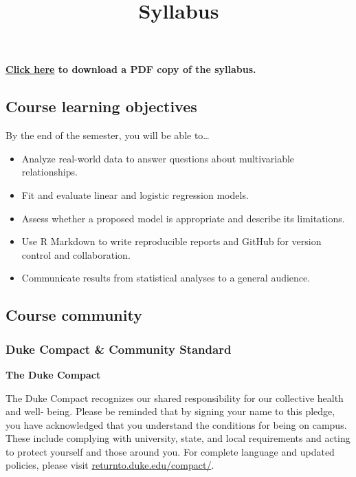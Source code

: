 \documentclass[
]{article}
\title{Syllabus}
\author{}
\date{\vspace{-2.5em}}
\providecommand{\tightlist}{%
  \setlength{\itemsep}{0pt}\setlength{\parskip}{0pt}}
\begin{document}
\maketitle

\textbf{\href{sta210-sp21-syllabus.pdf}{Click here} to download a PDF
copy of the syllabus.}

\hypertarget{course-learning-objectives}{%
\subsection{Course learning
objectives}\label{course-learning-objectives}}

By the end of the semester, you will be able to\ldots{}

\begin{itemize}
\tightlist
\item
  Analyze real-world data to answer questions about multivariable
  relationships.
\item
  Fit and evaluate linear and logistic regression models.
\item
  Assess whether a proposed model is appropriate and describe its
  limitations.
\item
  Use R Markdown to write reproducible reports and GitHub for version
  control and collaboration.
\item
  Communicate results from statistical analyses to a general audience.
\end{itemize}

\hypertarget{course-community}{%
\subsection{Course community}\label{course-community}}

\hypertarget{duke-compact-community-standard}{%
\subsubsection{Duke Compact \& Community
Standard}\label{duke-compact-community-standard}}

\textbf{The Duke Compact}

The Duke Compact recognizes our shared responsibility for our collective
health and well- being. Please be reminded that by signing your name to
this pledge, you have acknowledged that you understand the conditions
for being on campus. These include complying with university, state, and
local requirements and acting to protect yourself and those around you.
For complete language and updated policies, please visit
\href{https://returnto.duke.edu/compact/}{returnto.duke.edu/compact/}.
\end{document}
